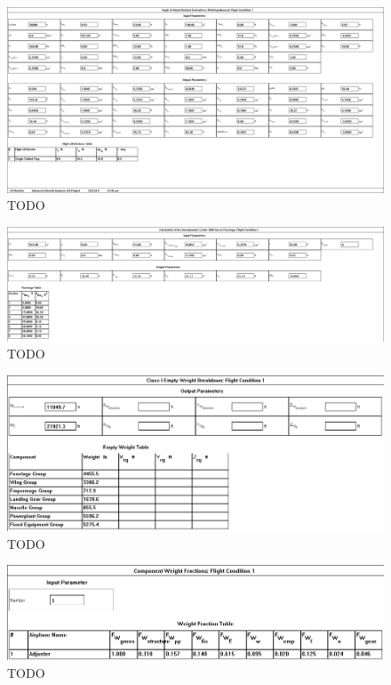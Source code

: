\documentclass[conf]{new-aiaa}
\begin{document}
\begin{figure}
    \includegraphics[width=\textwidth]{Report3Printouts/Stability/CM_alpha.png}
    \caption{TODO}
    \label{fig:TODO}
\end{figure}

\begin{figure}
    \includegraphics[width=\textwidth]{Report3Printouts/Stability/delta_x_ac_f_cropped.png}
    \caption{TODO}
    \label{fig:TODO}
\end{figure}


\begin{figure}
    \includegraphics[width=\textwidth]{Report3Printouts/Weight/ComponentWeights_cropped.png}
    \caption{TODO}
    \label{fig:TODO}
\end{figure}

\begin{figure}
    \includegraphics[width=\textwidth]{Report3Printouts/Weight/CustomAirplane_cropped.png}
    \caption{TODO}
    \label{fig:TODO}
\end{figure}
\end{document}
